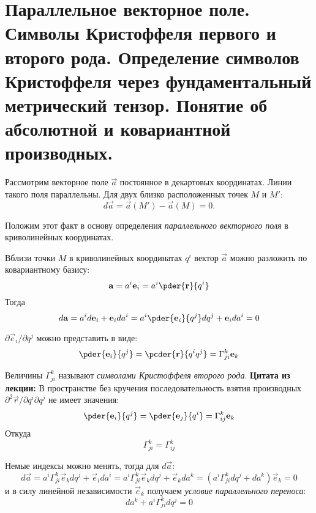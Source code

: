 \chapter{Параллельное векторное поле. Символы Кристоффеля первого и второго
рода. Определение символов Кристоффеля через фундаментальный метрический
тензор. Понятие об абсолютной и ковариантной производных.}

Рассмотрим векторное поле \( \vec{a} \) постоянное в декартовых координатах.
Линии такого поля параллельны. Для двух близко расположенных точек \( M \) и
\( M' \):
\[
    d\vec{a} = \vec{a}(M') - \vec{a}(M) = 0.
\]
    
Положим этот факт в основу определения \emph{параллельного векторного поля} в
криволинейных координатах.

Вблизи точки \( M \) в криволинейных координатах \( q^i \) вектор \( \vec{a} \)
можно разложить по ковариантному базису:
\[
    \vec{a} = a^i \vec{e}_{i} = a^i \pder{\vec{r}}{q^i}
\]
Тогда
\[
    d\vec{a} = a^i d\vec{e}_{i} + \vec{e}_{i} da^i  = 
    a^i \pder{\vec{e}_{i}}{q^j} dq^j + \vec{e}_{i} da^i = 0
\]
    
\( \partial\vec{e}_{i}/{\partial q^j} \) можно представить в виде:
\[
    \pder{\vec{e}_{i}}{q^j} = 
    \pcder{\vec{r}}{q^i q^j} =
    \Gamma^k_{ji} \vec{e}_{k}
\]

Величины \( \Gamma^k_{ji} \) называют \emph{символами Кристоффеля второго рода}.
\textbf{Цитата из лекции:} В пространстве без кручения последовательность
взятия производных \( \partial^2{\vec{r}}/{\partial q^i \partial  q^j} \) не
имеет значения:
\[
    \pder{\vec{e}_{i}}{q^j} = 
    \pder{\vec{e}_{j}}{q^i} =
    \Gamma^k_{ij} \vec{e}_{k}
\]
Откуда
\[
    \Gamma^k_{ji} = \Gamma^k_{ij}
\]

Немые индексы можно менять, тогда для \( d\vec{a} \):
\[
    d\vec{a} = 
    a^i \Gamma^k_{ji} \vec{e}_{k} dq^j + \vec{e}_{i} da^i = 
    a^i \Gamma^k_{ji} \vec{e}_{k} dq^j + \vec{e}_{k} da^k =
    \left(a^i \Gamma^k_{ji} dq^j + da^k\right)\vec{e}_{k}  =
    0   
\]
и в силу линейной независимости \( \vec{e}_{k} \) получаем \emph{условие
параллельного переноса}:
\[
    da^k + a^i \Gamma^k_{ji} dq^j  = 0
\]
    
